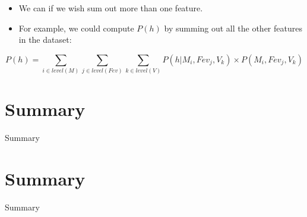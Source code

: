 \documentclass[xcolor={table}]{beamer}
\newcommand{\SectionSlide}[2][]{
	\ifthenelse{\isempty{#1}}
		{\section{#2}\begin{frame} \begin{center}\begin{huge}#2\end{huge}\end{center}\end{frame}}
		{\section[#1]{#2}\begin{frame} \begin{center}\begin{huge}#2\end{huge}\end{center}\end{frame}}
}
\begin{document}
 \begin{frame} 
 \begin{itemize}
 	\item We can if we wish sum out more than one feature. 
\end{itemize}
\begin{example}
\begin{itemize}
	\item For example, we could compute $P(h)$ by summing out all the other features in the dataset: 
\end{itemize}
\begin{footnotesize}
\begin{equation*}
P(h) =\sum_{i \in level(M)} \sum_{j \in level(Fev)} \sum_{k \in level(V)} P(h|M_i,Fev_j,V_k) \times P(M_i,Fev_j,V_k)
\end{equation*}
\end{footnotesize}
\end{example}
\end{frame} 

\SectionSlide{Summary}

\begin{frame}
	\tableofcontents
\end{frame}
\end{document}
